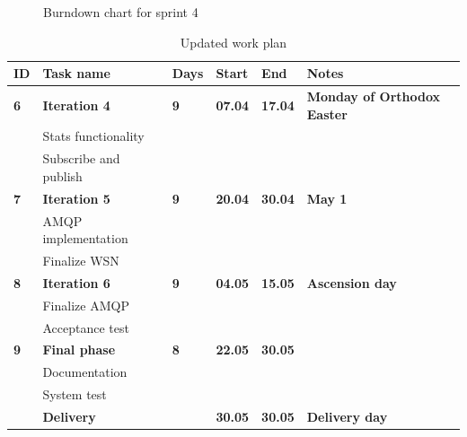 \begin{center}
  \begin{figure}[ht!]
    \caption{Burndown chart for sprint 4}
    \label{fig:sprint 4, burndown}
  \end{figure}
\end{center}


\begin{center}
\begin{table}[ht!]
\centering
\small
\begin{tabular}{ | m{0.4cm} | m{3.3cm}| m{0.7cm} | m{0.9cm} | m{0.9cm}| m{4.4cm} |} 
\hline
\rowcolor{lightgray}
\textbf{ID} & \textbf{Task name} & \textbf{Days} & \textbf{Start} & \textbf{End} & \textbf{Notes} \\
\hline
\textbf{6} & \textbf{Iteration 4} & \textbf{9} & \textbf{07.04} & \textbf{17.04} & \textbf{Monday of Orthodox Easter} \\
 & Stats functionality & & & & \\
 & Subscribe and publish  & & & & \\
\hline
\textbf{7} & \textbf{Iteration 5} & \textbf{9} & \textbf{20.04} & \textbf{30.04} & \textbf{May 1} \\
 & AMQP implementation & & & & \\
 & Finalize WSN & & & & \\
\hline 
\textbf{8} & \textbf{Iteration 6} & \textbf{9} & \textbf{04.05} & \textbf{15.05} & \textbf{Ascension day} \\
 & Finalize AMQP & & & & \\
 & Acceptance test & & & & \\
\hline
\textbf{9} & \textbf{Final phase} & \textbf{8} & \textbf{22.05} & \textbf{30.05} & \\
 & Documentation & & & & \\
 & System test & & & & \\
 & \textbf{Delivery} & & \textbf{30.05} & \textbf{30.05} & \textbf{Delivery day} \\
\hline
\end{tabular}
\caption{Updated work plan}
\label{tab:workplan, revised}
\end{table}
\end{center}

